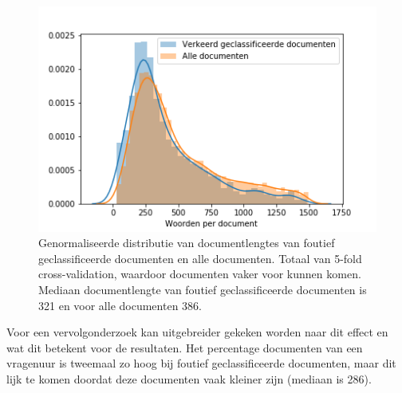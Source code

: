 \begin{figure}[H]
  \centering
    \includegraphics[width=0.40\paperwidth]{Verslag/Tables/misclassifiedlengths.png}
\caption{Genormaliseerde distributie van documentlengtes van foutief geclassificeerde documenten en alle documenten. Totaal van 5-fold cross-validation, waardoor documenten vaker voor kunnen komen. Mediaan documentlengte van foutief geclassificeerde documenten is 321 en voor alle documenten 386.}
\label{fig:misclassified}
\end{figure}
Voor een vervolgonderzoek kan uitgebreider gekeken worden naar dit effect en wat dit betekent voor de resultaten. Het percentage documenten van een vragenuur is tweemaal zo hoog bij foutief geclassificeerde documenten, maar dit lijk te komen doordat deze documenten vaak kleiner zijn (mediaan is 286).\par

